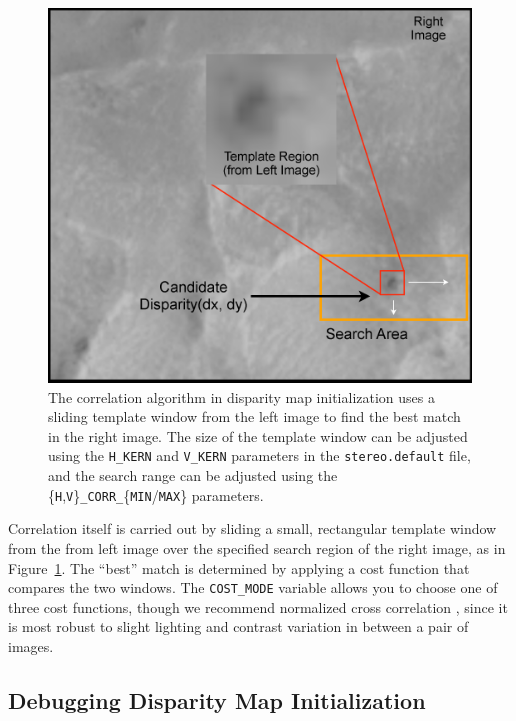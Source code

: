 \begin{figure}[bt]
  \centering
  \includegraphics[width=13cm]{images/correlation/correlation}
  \caption{The correlation algorithm in disparity map initialization
    uses a sliding template window from the left image to find the
    best match in the right image.  The size of the template window
    can be adjusted using the \texttt{H\_KERN} and \texttt{V\_KERN} parameters in the
    \texttt{stereo.default} file, and the search range can be adjusted
    using the \{\texttt{H},\texttt{V}\}\texttt{\_CORR\_}\{\texttt{MIN}/\texttt{MAX}\} parameters.}
  \label{fig:correlation_window}
\end{figure}

Correlation itself is carried out by sliding a small, rectangular
template window from the from left image over the specified search
region of the right image, as in Figure~\ref{fig:correlation_window}.
The ``best'' match is determined by applying a cost function that
compares the two windows.  The \texttt{COST\_MODE} variable allows you to
choose one of three cost functions, though we recommend normalized
cross correlation \citep{Menard97:robust}, since it is most robust to
slight lighting and contrast variation in between a pair of images.

\subsection{Debugging Disparity Map Initialization}


